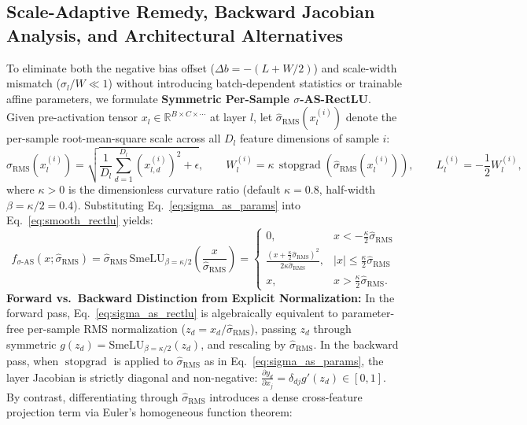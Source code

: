 \documentclass[10pt,a4paper]{article}
\begin{document}
\subsection{Scale-Adaptive Remedy, Backward Jacobian Analysis, and Architectural Alternatives}
To eliminate both the negative bias offset ($\Delta b = -(L+W/2)$) and scale-width mismatch ($\sigma_l / W \ll 1$) without introducing batch-dependent statistics or trainable affine parameters, we formulate \textbf{Symmetric Per-Sample $\sigma$-AS-RectLU}. Given pre-activation tensor $x_l \in \mathbb{R}^{B \times C \times \cdots}$ at layer $l$, let $\hat{\sigma}_{\text{RMS}}(x_l^{(i)})$ denote the per-sample root-mean-square scale across all $D_l$ feature dimensions of sample $i$:
\begin{equation}
    \hat{\sigma}_{\text{RMS}}(x_l^{(i)}) = \sqrt{\frac{1}{D_l}\sum_{d=1}^{D_l} \left(x_{l,d}^{(i)}\right)^2 + \epsilon}, \qquad W_l^{(i)} = \kappa \, \operatorname{stopgrad}\!\left(\hat{\sigma}_{\text{RMS}}(x_l^{(i)})\right), \qquad L_l^{(i)} = -\frac{1}{2}W_l^{(i)},
    \label{eq:sigma_as_params}
\end{equation}
where $\kappa > 0$ is the dimensionless curvature ratio (default $\kappa = 0.8$, half-width $\beta = \kappa/2 = 0.4$). Substituting Eq.~\eqref{eq:sigma_as_params} into Eq.~\eqref{eq:smooth_rectlu} yields:
\begin{equation}
    f_{\sigma\text{-AS}}(x; \hat{\sigma}_{\text{RMS}}) = \hat{\sigma}_{\text{RMS}} \, \text{SmeLU}_{\beta = \kappa/2}\!\left(\frac{x}{\hat{\sigma}_{\text{RMS}}}\right) = \begin{cases}
        0, & x < -\frac{\kappa}{2}\hat{\sigma}_{\text{RMS}} \\
        \frac{(x + \frac{\kappa}{2}\hat{\sigma}_{\text{RMS}})^2}{2\kappa\hat{\sigma}_{\text{RMS}}}, & |x| \le \frac{\kappa}{2}\hat{\sigma}_{\text{RMS}} \\
        x, & x > \frac{\kappa}{2}\hat{\sigma}_{\text{RMS}}.
    \end{cases}
    \label{eq:sigma_as_rectlu}
\end{equation}
\textbf{Forward vs.\ Backward Distinction from Explicit Normalization:} In the forward pass, Eq.~\eqref{eq:sigma_as_rectlu} is algebraically equivalent to parameter-free per-sample RMS normalization ($z_d = x_d / \hat{\sigma}_{\text{RMS}}$), passing $z_d$ through symmetric $g(z_d) = \text{SmeLU}_{\beta=\kappa/2}(z_d)$, and rescaling by $\hat{\sigma}_{\text{RMS}}$. In the backward pass, when $\operatorname{stopgrad}$ is applied to $\hat{\sigma}_{\text{RMS}}$ as in Eq.~\eqref{eq:sigma_as_params}, the layer Jacobian is strictly diagonal and non-negative: $\frac{\partial y_d}{\partial x_j} = \delta_{dj} g'(z_d) \in [0, 1]$. By contrast, differentiating through $\hat{\sigma}_{\text{RMS}}$ introduces a dense cross-feature projection term via Euler's homogeneous function theorem:
\end{document}
